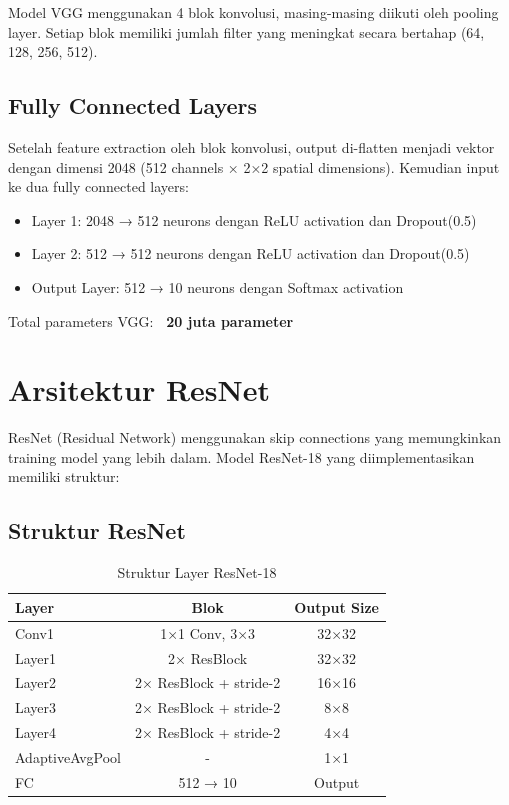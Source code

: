 \documentclass[12pt,a4paper]{report}
\begin{document}
Model VGG menggunakan 4 blok konvolusi, masing-masing diikuti oleh pooling layer. Setiap blok memiliki jumlah filter yang meningkat secara bertahap (64, 128, 256, 512).

\subsection{Fully Connected Layers}

Setelah feature extraction oleh blok konvolusi, output di-flatten menjadi vektor dengan dimensi 2048 (512 channels × 2×2 spatial dimensions). Kemudian input ke dua fully connected layers:

\begin{itemize}
    \item Layer 1: 2048 → 512 neurons dengan ReLU activation dan Dropout(0.5)
    \item Layer 2: 512 → 512 neurons dengan ReLU activation dan Dropout(0.5)
    \item Output Layer: 512 → 10 neurons dengan Softmax activation
\end{itemize}

Total parameters VGG: \textbf{~20 juta parameter}

\section{Arsitektur ResNet}

ResNet (Residual Network) menggunakan skip connections yang memungkinkan training model yang lebih dalam. Model ResNet-18 yang diimplementasikan memiliki struktur:

\subsection{Struktur ResNet}

\begin{table}[H]
\centering
\caption{Struktur Layer ResNet-18}
\begin{tabular}{|l|c|c|}
\hline
\textbf{Layer} & \textbf{Blok} & \textbf{Output Size} \\
\hline
Conv1 & 1×1 Conv, 3×3 & 32×32 \\
\hline
Layer1 & 2× ResBlock & 32×32 \\
\hline
Layer2 & 2× ResBlock + stride-2 & 16×16 \\
\hline
Layer3 & 2× ResBlock + stride-2 & 8×8 \\
\hline
Layer4 & 2× ResBlock + stride-2 & 4×4 \\
\hline
AdaptiveAvgPool & - & 1×1 \\
\hline
FC & 512 → 10 & Output \\
\hline
\end{tabular}
\end{table}
\end{document}
